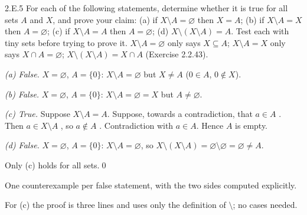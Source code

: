 \begin{bookex}[recommended]{2.E.5}
For each of the following statements, determine whether it is true for all sets $A$ and $X$, and prove your claim: (a) if $X\setminus A=\varnothing$ then $X=A$; (b) if $X\setminus A=X$ then $A=\varnothing$; (c) if $X\setminus A=A$ then $A=\varnothing$; (d) $X\setminus(X\setminus A)=A$.
\solution
\plan Test each with tiny sets before trying to prove it. $X\setminus A=\varnothing$ only says $X\subseteq A$; $X\setminus A=X$ only says $X\cap A=\varnothing$; $X\setminus(X\setminus A)=X\cap A$ (Exercise 2.2.43).
\begin{steps}
\item \emph{(a) False.} $X=\varnothing$, $A=\{0\}$: $X\setminus A=\varnothing$ but $X\ne A$ ($0\in A$, $0\notin X$).
\item \emph{(b) False.} $X=\varnothing$, $A=\{0\}$: $X\setminus A=\varnothing=X$ but $A\ne\varnothing$.
\item \emph{(c) True.} Suppose $X\setminus A=A$. Suppose, towards a contradiction, that $a\in A$ . Then $a\in X\setminus A$ , so $a\notin A$ . Contradiction with $a\in A$. Hence $A$ is empty.
\item \emph{(d) False.} $X=\varnothing$, $A=\{0\}$: $X\setminus A=\varnothing$, so $X\setminus(X\setminus A)=\varnothing\setminus\varnothing=\varnothing\ne A$.
\end{steps}
\conclusion Only (c) holds for all sets.\qed
\begin{compare}
\item One counterexample per false statement, with the two sides computed explicitly.
\item For (c) the proof is three lines and uses only the definition of $\setminus$; no cases needed.
\end{compare}
\end{bookex}

